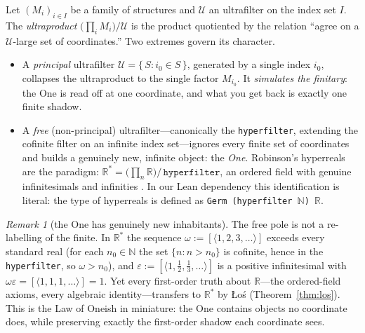\documentclass[]{article}
\theoremstyle{definition}
\theoremstyle{remark}
\newtheorem{remark}[theorem]{Remark}
\newcommand{\code}[1]{\texttt{#1}}
\newcommand{\Uf}{\mathcal{U}}
\newcommand{\R}{\mathbb{R}}
\newcommand{\N}{\mathbb{N}}
\DeclareMathOperator{\uprod}{\textstyle\prod}
\begin{document}
Let $(M_i)_{i\in I}$ be a family of structures and $\Uf$ an ultrafilter on the
index set $I$. The \emph{ultraproduct} $\bigl(\uprod_i M_i\bigr)/\Uf$ is the
product quotiented by the relation ``agree on a $\Uf$-large set of
coordinates.'' Two extremes govern its character.

\begin{itemize}
\item A \emph{principal} ultrafilter $\Uf=\{\,S : i_0\in S\,\}$, generated by a
single index $i_0$, collapses the ultraproduct to the single factor
$M_{i_0}$. It \emph{simulates the finitary}: the One is read off at one
coordinate, and what you get back is exactly one finite shadow.
\item A \emph{free} (non-principal) ultrafilter---canonically the
\code{hyperfilter}, extending the cofinite filter on an infinite index set---ignores
every finite set of coordinates and builds a genuinely new, infinite object: the
\emph{One}. Robinson's hyperreals are the paradigm: $\R^{\!*}=\bigl(\uprod_{n}
\R\bigr)/\,\code{hyperfilter}$, an ordered field with genuine infinitesimals and
infinities \cite{Robinson1966, Goldblatt1998, Keisler}. In our Lean dependency this
identification is literal: the type of hyperreals is defined as
\code{Germ (hyperfilter $\N$) $\R$}.
\end{itemize}

\begin{remark}[the One has genuinely new inhabitants]
\label{rem:hyperreal}
The free pole is not a re-labelling of the finite. In $\R^{\!*}$ the sequence
$\omega:=[\langle 1,2,3,\dots\rangle]$ exceeds every standard real (for each
$n_0\in\N$ the set $\{n : n>n_0\}$ is cofinite, hence in the \code{hyperfilter}, so
$\omega>n_0$), and $\varepsilon:=[\langle 1,\tfrac12,\tfrac13,\dots\rangle]$ is a
positive infinitesimal with $\omega\varepsilon=[\langle 1,1,1,\dots\rangle]=1$.
Yet every first-order truth about $\R$---the ordered-field axioms, every algebraic
identity---transfers to $\R^{\!*}$ by {\L}o\'s (Theorem~\ref{thm:los}). This is the
Law of Oneish in miniature: the One contains objects no coordinate does, while
preserving exactly the first-order shadow each coordinate sees.
\end{remark}
\end{document}
